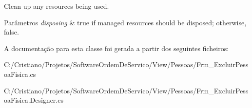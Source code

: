 Clean up any resources being used. 


\begin{DoxyParams}{Parâmetros}
{\em disposing} & true if managed resources should be disposed; otherwise, false.\\
\hline
\end{DoxyParams}


A documentação para esta classe foi gerada a partir dos seguintes ficheiros\+:\begin{DoxyCompactItemize}
\item 
C\+:/\+Cristiano/\+Projetos/\+Software\+Ordem\+De\+Servico/\+View/\+Pessoas/Frm\+\_\+\+Excluir\+Pessoa\+Fisica.\+cs\item 
C\+:/\+Cristiano/\+Projetos/\+Software\+Ordem\+De\+Servico/\+View/\+Pessoas/Frm\+\_\+\+Excluir\+Pessoa\+Fisica.\+Designer.\+cs\end{DoxyCompactItemize}
